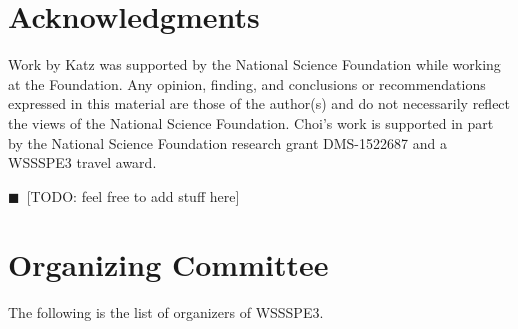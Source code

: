 \documentclass[11pt, oneside]{amsart}
\newcommand{\todo}[1]{{\color{blue}$\blacksquare$~\textsf{[TODO: #1]}}}
\begin{document}
%



\section*{Acknowledgments} \label{sec:acks}

Work by Katz was supported by the National Science Foundation while working at
the Foundation. Any opinion, finding, and conclusions or recommendations
expressed in this material are those of the author(s) and do not necessarily
reflect the views of the National Science Foundation. Choi's work is supported
in part by the National Science Foundation research grant DMS-1522687 and
a WSSSPE3 travel award. 

\todo{feel free to add stuff here}


\appendix
\section{Organizing Committee}  \label{sec:orgcom}
The following is the list of organizers of WSSSPE3.
\end{document}
